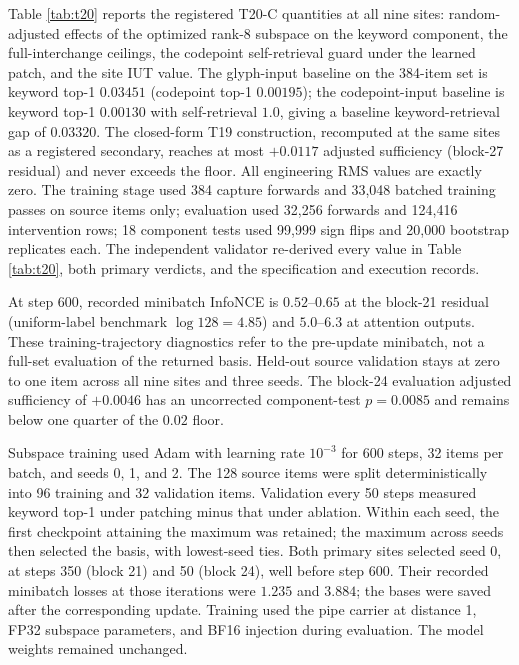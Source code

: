 \documentclass{article}
\begin{document}
Table \ref{tab:t20} reports the registered T20-C quantities at all nine
sites: random-adjusted effects of the optimized rank-8 subspace on the
keyword component, the full-interchange ceilings, the codepoint
self-retrieval guard under the learned patch, and the site IUT value. The
glyph-input baseline on the 384-item set is keyword top-1 $0.03451$
(codepoint top-1 $0.00195$); the codepoint-input baseline is keyword top-1
$0.00130$ with self-retrieval $1.0$, giving a baseline keyword-retrieval gap of
$0.03320$. The closed-form T19 construction, recomputed at the same sites as
a registered secondary, reaches at most $+0.0117$ adjusted sufficiency
(block-27 residual) and never exceeds the floor. All engineering RMS values
are exactly zero. The training stage used 384 capture forwards and 33,048
batched training passes on source items only; evaluation used 32,256 forwards
and 124,416 intervention rows; 18 component tests used 99,999 sign flips and
20,000 bootstrap replicates each. The independent validator re-derived every
value in Table \ref{tab:t20}, both primary verdicts, and the specification
and execution records.

At step 600, recorded minibatch InfoNCE is $0.52$--$0.65$ at the block-21
residual (uniform-label benchmark $\log 128=4.85$) and $5.0$--$6.3$ at
attention outputs. These training-trajectory diagnostics refer to the
pre-update minibatch, not a full-set evaluation of the returned basis.
Held-out source validation stays at zero to one item across all nine sites
and three seeds.
The block-24 evaluation adjusted sufficiency of $+0.0046$ has an uncorrected
component-test $p=0.0085$ and remains below one quarter of the $0.02$ floor.

Subspace training used Adam with learning rate $10^{-3}$ for 600 steps,
32 items per batch, and seeds 0, 1, and 2. The 128 source items were split
deterministically into 96 training and 32 validation items. Validation every
50 steps measured keyword top-1 under patching minus that under ablation.
Within each seed, the first checkpoint attaining the maximum was retained;
the maximum across seeds then selected the basis, with lowest-seed ties.
Both primary sites selected seed 0, at steps 350 (block 21) and 50 (block 24),
well before step 600. Their recorded minibatch losses at those iterations
were $1.235$ and $3.884$; the bases were saved after the corresponding update.
Training used the pipe carrier at distance 1,
FP32 subspace parameters, and BF16 injection during evaluation. The model
weights remained unchanged.
\end{document}
